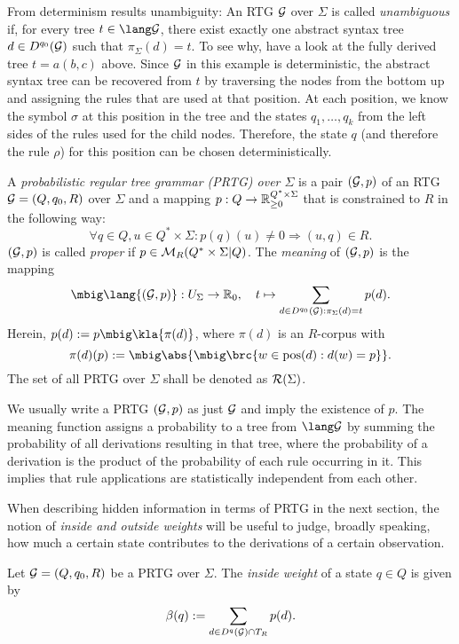 From determinism results unambiguity: An RTG $\mathcal G$ over $\Sigma$ is called
\emph{unambiguous} if, for every tree $t\in\lang\ug$, there exist exactly one
abstract syntax tree $d\in D^{q_0}(\mathcal G)$ such that $\pi_\Sigma(d) = t$. To see why, have
a look at the fully derived tree $t = a(b,c)$ above. Since $\mathcal G$ in this
example is deterministic, the abstract syntax tree can be recovered from $t$ by
traversing the nodes from the bottom up and assigning the rules that are used
at that position. At each position, we know the symbol $\sigma$ at this
position in the tree and the states $q_1,\ldots,q_k$ from the left sides of the
rules used for the child nodes. Therefore, the state $q$ (and therefore the
rule $\rho$) for this position can be chosen deterministically.

\begin{definition}
 A \emph{probabilistic regular tree grammar (PRTG) over $\Sigma$} is a pair
 $(\mathcal G,p)$ of an RTG $\mathcal G=(Q,q_0,R)$ over $\Sigma$ and a mapping
 $p:Q\to\mathbb R_{\geq0}^{Q^*\times\Sigma}$ that is constrained to $R$ in the
 following way:
 \[
  \forall q\in Q, u\in Q^*\times\Sigma: p(q)(u) \neq 0 \Rightarrow (u,q) \in R.
 \]
 $(\mathcal G,p)$ is called \emph{proper} if $p\in\mathcal M_R(Q^*\times\Sigma|Q)$. The
 \emph{meaning} of $(\mathcal G,p)$ is the mapping
 \[
  \mbig\lang{(\ug,p)}: U_\Sigma \to \zr_0, \quad
  t \mapsto \sum_{d\in D^{q_0}(\ug): \pi_\Sigma(d)=t} p(d).
 \]
 Herein, $p(d) := p\mbig\kla{\pi(d)}$, where $\pi(d)$ is an $R$-corpus with
 \[
  \pi(d)(p) := \mbig\abs{\mbig\brc{w\in\pos(d): d(w)=p}}.
 \]
 The set of all PRTG over $\Sigma$ shall be denoted as $\mathcal R(\Sigma)$.
\end{definition}

We usually write a PRTG $(\mathcal G,p)$ as just $\mathcal G$ and imply the existence of $p$.
The meaning function assigns a probability to a tree from $\lang\ug$ by summing
the probability of all derivations resulting in that tree, where the
probability of a derivation is the product of the probability of each rule
occurring in it. This implies that rule applications are statistically
independent from each other.

When describing hidden information in terms of PRTG in the next section, the
notion of \emph{inside and outside weights} will be useful to judge, broadly
speaking, how much a certain state contributes to the derivations of a certain
observation.

\begin{definition}
 Let $\mathcal G = (Q,q_0,R)$ be a PRTG over $\Sigma$. The \emph{inside weight} of a
 state $q\in Q$ is given by
 \[
  \beta(q) := \sum_{d\in D^q(\mathcal G)\cap T_R} p(d).
 \]
\end{definition}

